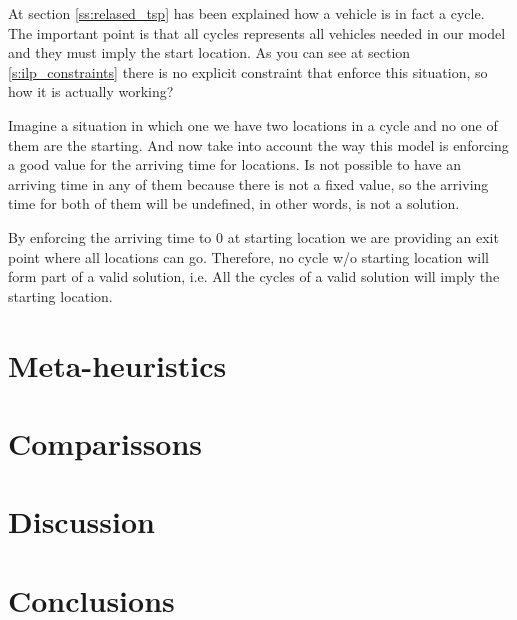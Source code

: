 \documentclass[]{report}
\begin{document}
At section \ref{ss:relased_tsp} has been explained how a vehicle is in fact a cycle. The important point is that all cycles represents all vehicles needed in our model and they must imply the start location. As you can see at section \ref{s:ilp_constraints} there is no explicit constraint that enforce this situation, so how it is actually  working?

Imagine a situation in which one we have two locations in a cycle and no one of them are the starting. And now take into account the way this model is enforcing a good value for the arriving time for locations. Is not possible to have an arriving time in any of them because there is not a fixed value, so the arriving time for both of them will be undefined, in other words, is not a solution.

By enforcing the arriving time to $0$ at starting location we are providing an exit point where all locations can go. Therefore, no cycle w/o starting location will form part of a valid solution, i.e. All the cycles of a valid solution will imply the starting location.

\chapter{Meta-heuristics}\label{ch:meta_heuristics}

\chapter{Comparissons}\label{ch:comparisson}

\chapter{Discussion}\label{ch:discussion}

\chapter{Conclusions}\label{ch:conclusions}
\end{document}

